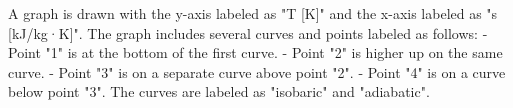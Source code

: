 A graph is drawn with the y-axis labeled as "T [K]" and the x-axis labeled as "s [kJ/kg·K]". The graph includes several curves and points labeled as follows:  
- Point "1" is at the bottom of the first curve.  
- Point "2" is higher up on the same curve.  
- Point "3" is on a separate curve above point "2".  
- Point "4" is on a curve below point "3".  
The curves are labeled as "isobaric" and "adiabatic".